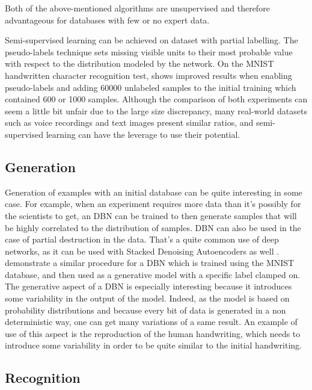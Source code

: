 \documentclass{report}
\begin{document}
	Both of the above-mentioned algorithms are unsupervised and therefore 
	advantageous for databases with few or no expert data. 
	
	Semi-supervised learning can be achieved on dataset with partial labelling. The 
	pseudo-labels technique sets missing visible units to their most probable value 
	with respect to the distribution modeled by the network. On the MNIST 
	handwritten character recognition test, \cite{lee2013pseudo} shows improved 
	results when enabling pseudo-labels and adding 60000 unlabeled samples to the 
	initial training which contained 600 or 1000 samples. Although the comparison 
	of both experiments can seem a little bit unfair due to the large size 
	discrepancy, many real-world datasets such as voice recordings and text images 
	present similar ratios, and semi-supervised learning can have the leverage to 
	use their potential.
	
	\subsection{Generation}
	
	Generation of examples with an initial database can be quite interesting in 
	some case. For example, when an experiment requires more data than it's 
	possibly for the scientists to get, an DBN can be trained to then generate 
	samples that will be highly correlated to the distribution of samples. DBN can 
	also be used in the case of partial destruction in the data. That's a quite 
	common use of deep networks, as it can be used with Stacked Denoising 
	Autoencoders as well \cite{vincent2010stacked}. 
	\cite{hinton2006fast} demonstrate a similar procedure for a DBN 
	which is trained using the MNIST database, and then used as a generative model 
	with a specific label clamped on. The generative aspect of a DBN is especially 
	interesting because it introduces some variability in the output of the model. 
	Indeed, as the model is based on probability distributions and because every 
	bit of data is generated in a non deterministic way, one can get many 
	variations of a same result. An example of use of this aspect is the 
	reproduction of the human handwriting, which needs to introduce some 
	variability in order to be quite similar to the initial handwriting. 

	\subsection{Recognition}
	
\end{document}
